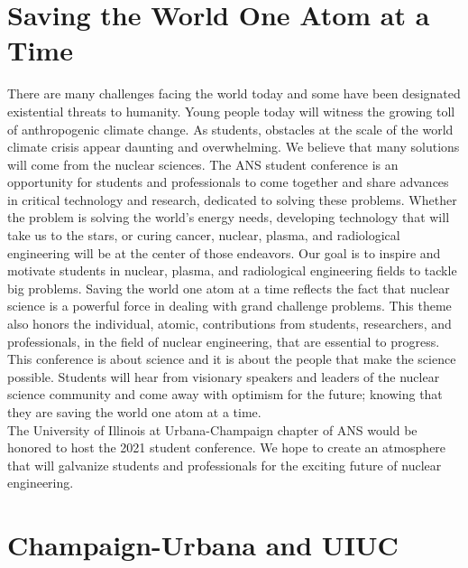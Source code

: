 \documentclass[11pt, letterpaper]{article}
\begin{document}
\section{Saving the World One Atom at a Time}
There are many challenges facing the world today and some have been designated existential threats to humanity. Young people today will witness the growing toll of anthropogenic climate change. As students, obstacles at the scale of the world climate crisis appear daunting and overwhelming. We believe that many solutions will come from the nuclear sciences. The ANS student conference is an opportunity for students and professionals to come together and share advances in critical technology and research, dedicated to solving these problems. Whether the problem is solving the world’s energy needs, developing technology that will take us to the stars, or curing cancer, nuclear, plasma, and radiological engineering will be at the center of those endeavors. Our goal is to inspire and motivate students in nuclear, plasma, and radiological engineering fields to tackle big problems. Saving the world one atom at a time reflects the fact that nuclear science is a powerful force in dealing with grand challenge problems. This theme also honors the individual, atomic, contributions from students, researchers, and professionals, in the field of nuclear engineering, that are essential to progress. This conference is about science and it is about the people that make the science possible. Students will hear from visionary speakers and leaders of the nuclear science community and come away with optimism for the future; knowing that they are saving the world one atom at a time.\\
The University of Illinois at Urbana-Champaign chapter of ANS would be honored to host the 2021 student conference. We hope to create an atmosphere that will galvanize students and professionals for the exciting future of nuclear engineering.


\newpage
\section{Champaign-Urbana and UIUC}
\end{document}
